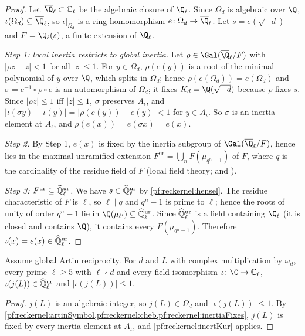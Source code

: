 \begin{proof}
Let $\overline{\Q}_\ell\subset\reckCl$ be the algebraic closure of $\Q_\ell$. Since $\Omega_d$ is algebraic over
$\Q$, $\iota(\Omega_d)\subseteq\overline\Q_\ell$, so $\iota|_{\Omega_d}$ is a ring homomorphism
$e\colon\Omega_d\to\overline\Q_\ell$. Let
$s=e(\sqrt{-d})$ and $F=\Q_\ell(s)$, a finite extension of $\Q_\ell$.

\emph{Step 1: local inertia restricts to global inertia.} Let $\rho\in\Gal(\overline\Q_\ell/F)$ with
$|\rho z-z|<1$ for all $|z|\le1$. For $y\in\Omega_d$, $\rho(e(y))$ is a root of the minimal polynomial of $y$
over $\Q$, which splits in $\Omega_d$; hence $\rho(e(\Omega_d))=e(\Omega_d)$ and $\sigma=e^{-1}\circ\rho\circ e$ is an
automorphism of $\Omega_d$; it fixes $K_d=\Q(\sqrt{-d})$ because $\rho$ fixes $s$. Since $|\rho z|\le1$ iff
$|z|\le1$, $\sigma$ preserves $A_\iota$, and $|\iota(\sigma y)-\iota(y)|=|\rho(e(y))-e(y)|<1$ for $y\in A_\iota$. So
$\sigma$ is an inertia element at $A_\iota$, and $\rho(e(x))=e(\sigma x)=e(x)$.

\emph{Step 2.} By Step 1, $e(x)$ is fixed by the inertia subgroup of $\Gal(\overline\Q_\ell/F)$, hence lies in the
maximal unramified extension $F^{\mathrm{ur}}=\bigcup_n F(\mu_{q^n-1})$ of $F$, where $q$ is the cardinality of
the residue field of $F$ (local field theory;  and ).

\emph{Step 3: $F^{\mathrm{ur}}\subseteq\widehat{\mathbb{Q}}{}_\ell^{\mathrm{ur}}$.} We have $s\in\widehat{\mathbb{Q}}{}_\ell^{\mathrm{ur}}$ by \cref{pf:reckernel:hensel}. The residue
characteristic of $F$ is $\ell$, so $\ell\mid q$ and $q^n-1$ is prime to $\ell$; hence the roots of unity of order
$q^n-1$ lie in $\Q(\mu_{\ell'})\subseteq\reckKur$. Since $\widehat{\mathbb{Q}}{}_\ell^{\mathrm{ur}}$ is a field containing $\Q_\ell$ (it is closed
and contains $\Q$), it contains every $F(\mu_{q^n-1})$. Therefore $\iota(x)=e(x)\in\widehat{\mathbb{Q}}{}_\ell^{\mathrm{ur}}$.
\end{proof}

\begin{corollary}\label{pf:reckernel:jUnram}
Assume global Artin reciprocity. For $d$ and $L$ with complex multiplication by $\omega_d$, every prime $\ell\ge5$
with $\ell\nmid d$ and every field isomorphism $\iota\colon\C\to\reckCl$, $\iota(j(L))\in\widehat{\mathbb{Q}}{}_\ell^{\mathrm{ur}}$ and
$|\iota(j(L))|\le1$.
\end{corollary}

\begin{proof}
$j(L)$ is an algebraic integer, so $j(L)\in\Omega_d$ and $|\iota(j(L))|\le1$. By
\cref{pf:reckernel:artinSymbol,pf:reckernel:cheb,pf:reckernel:inertiaFixes}, $j(L)$ is fixed by every inertia
element at $A_\iota$, and \cref{pf:reckernel:inertKur} applies.
\end{proof}

